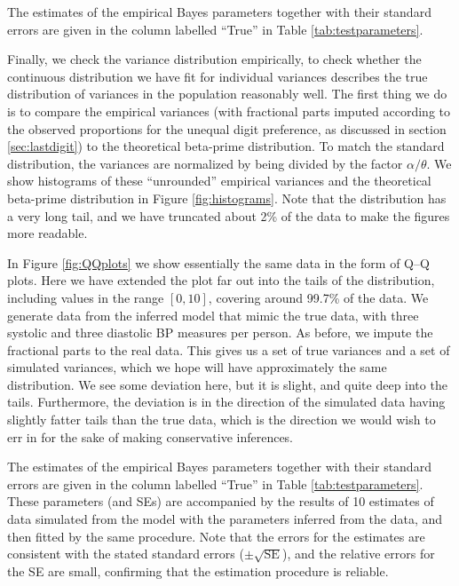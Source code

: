 \documentclass[
]{article}
\begin{document}
The estimates of the empirical Bayes parameters together with their standard errors are given in the column labelled ``True'' in Table \ref{tab:testparameters}.

Finally, we check the variance distribution empirically, to check whether the continuous distribution we have fit for individual variances describes the true distribution of variances in the population reasonably well.
The first thing we do is to compare the empirical
variances (with fractional parts imputed according to the observed proportions for the unequal digit preference, as discussed in section \ref{sec:lastdigit}) to the theoretical beta-prime distribution.
To match the standard distribution, the variances are normalized by being divided by the factor \(\alpha/\theta\).
We show histograms of these ``unrounded'' empirical variances and the theoretical beta-prime distribution in Figure \ref{fig:histograms}.
Note that the distribution has a very long tail, and we have truncated about 2\% of the data to make the figures more readable.

In Figure \ref{fig:QQplots} we show essentially the same data in the form of Q--Q plots.
Here we have extended the plot far out into the tails of the distribution, including values in the range \([0,10]\), covering around 99.7\% of the data.
We generate data from the inferred model that mimic the true data, with three systolic and three diastolic BP measures per person.
As before, we impute the fractional parts to the real data.
This gives us a set of true variances and a set of simulated variances, which we hope will have approximately the same distribution.
We see some deviation here, but it is slight, and quite deep into the tails.
Furthermore, the deviation is in the direction of the simulated data having slightly fatter tails than the true data, which is the direction we would wish to err in for the sake of making conservative inferences.

The estimates of the empirical Bayes parameters together with their standard errors are given in the column labelled ``True'' in Table \ref{tab:testparameters}.
These parameters (and SEs) are accompanied by the results of 10 estimates of data simulated from the model with the parameters inferred from the data, and then fitted by the same procedure.
Note that the errors for the estimates are consistent with the stated standard errors (\(\pm \sqrt{\operatorname{SE}}\)), and the relative errors for the SE are small, confirming that the estimation procedure is reliable.
\end{document}
